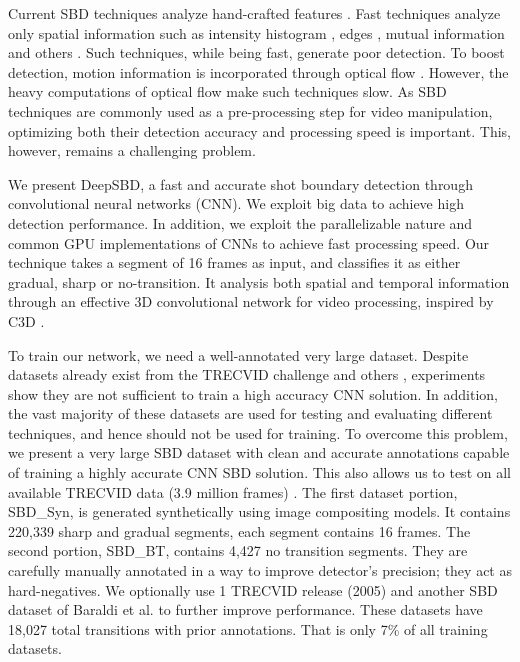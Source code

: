 \documentclass[journal]{IEEEtran}
\begin{document}
Current SBD techniques analyze hand-crafted features \cite{Priya14,Lu13,Smeaton10,Mohanta12,Adjeroh09,Cernekova06,Lankinen13,Lelescu03,Zhang12,Thounaojam16}. Fast techniques analyze only spatial information such as intensity histogram \cite{Lu13,Zhang12}, edges \cite{Adjeroh09}, mutual information and others \cite{Cernekova06,Thounaojam16,Lelescu03,Lankinen13}. Such techniques, while being fast, generate poor detection. To boost detection, motion information is incorporated through optical flow \cite{Priya14,Smeaton10,Yuan04,Liu07}. However, the heavy computations of optical flow \cite{Tao12,Dosovitskiy15,Baker11} make such techniques slow. As SBD techniques are commonly used as a pre-processing step for video manipulation, optimizing both their detection accuracy and processing speed is important. This, however, remains a challenging problem.   



We present DeepSBD, a fast and accurate shot boundary detection through convolutional neural networks (CNN). We exploit big data to achieve high detection performance. In addition, we exploit the parallelizable nature and common GPU implementations of CNNs to achieve fast processing speed. Our technique takes a segment of 16 frames as input, and classifies it as either gradual, sharp or no-transition. It analysis both spatial and temporal information through an effective 3D convolutional network for video processing, inspired by C3D \cite{Tran15}. 

To train our network, we need a well-annotated very large dataset. Despite datasets already exist from the TRECVID challenge and others \cite{Smeaton10,Baraldi15}, experiments show they are not sufficient to train a high accuracy CNN solution. In addition, the vast majority of these datasets are used for testing and evaluating different techniques, and hence should not be used for training. To overcome this problem, we present a very large SBD dataset with clean and accurate annotations capable of training a highly accurate CNN SBD solution.    
This also allows us to test on all available TRECVID data (3.9 million frames) \cite{Smeaton10}. The first dataset portion, SBD\_Syn, is generated synthetically using image compositing models. It contains 220,339 sharp and gradual segments, each segment contains 16 frames. The second portion, SBD\_BT, contains 4,427 no transition segments. They are carefully manually annotated in a way to improve detector's precision; they act as hard-negatives. We optionally use 1 TRECVID release (2005) and another SBD dataset of Baraldi et al. \cite{Baraldi15} to further improve performance. These datasets have 18,027 total transitions with prior annotations. That is only 7\% of all training datasets.   
\end{document}
